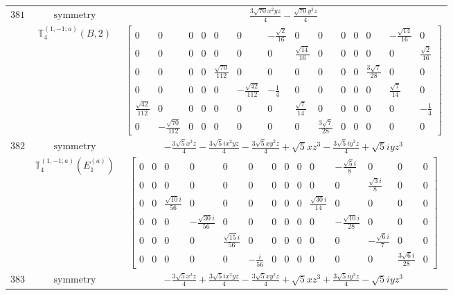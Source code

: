 \documentclass[fleqn,8pt,landscape]{jsarticle}
\begin{document}
\begin{longtable}{ccc}
$ 381 $ & $ \text{symmetry} $ & $ \frac{3 \sqrt{70} x^{2} y z}{4} - \frac{\sqrt{70} y^{3} z}{4} $ \\
$  $ & $ \mathbb{T}_{4}^{(1,-1;a)}(B,2) $ & $ \begin{bmatrix} 0 & 0 & 0 & 0 & 0 & 0 & - \frac{\sqrt{2}}{16} & 0 & 0 & 0 & 0 & 0 & - \frac{\sqrt{14}}{16} & 0 \\ 0 & 0 & 0 & 0 & 0 & 0 & 0 & \frac{\sqrt{14}}{16} & 0 & 0 & 0 & 0 & 0 & \frac{\sqrt{2}}{16} \\ 0 & 0 & 0 & 0 & \frac{\sqrt{70}}{112} & 0 & 0 & 0 & 0 & 0 & 0 & \frac{3 \sqrt{7}}{28} & 0 & 0 \\ 0 & 0 & 0 & 0 & 0 & - \frac{\sqrt{42}}{112} & - \frac{1}{4} & 0 & 0 & 0 & 0 & 0 & \frac{\sqrt{7}}{14} & 0 \\ \frac{\sqrt{42}}{112} & 0 & 0 & 0 & 0 & 0 & 0 & \frac{\sqrt{7}}{14} & 0 & 0 & 0 & 0 & 0 & - \frac{1}{4} \\ 0 & - \frac{\sqrt{70}}{112} & 0 & 0 & 0 & 0 & 0 & 0 & \frac{3 \sqrt{7}}{28} & 0 & 0 & 0 & 0 & 0 \end{bmatrix} $ \\ \hline
$ 382 $ & $ \text{symmetry} $ & $ - \frac{3 \sqrt{5} x^{3} z}{4} - \frac{3 \sqrt{5} i x^{2} y z}{4} - \frac{3 \sqrt{5} x y^{2} z}{4} + \sqrt{5} x z^{3} - \frac{3 \sqrt{5} i y^{3} z}{4} + \sqrt{5} i y z^{3} $ \\
$  $ & $ \mathbb{T}_{4}^{(1,-1;a)}(E_{1}^{(a)}) $ & $ \begin{bmatrix} 0 & 0 & 0 & 0 & 0 & 0 & 0 & 0 & 0 & 0 & - \frac{\sqrt{5} i}{8} & 0 & 0 & 0 \\ 0 & 0 & 0 & 0 & 0 & 0 & 0 & 0 & 0 & 0 & 0 & \frac{\sqrt{3} i}{8} & 0 & 0 \\ 0 & 0 & \frac{\sqrt{10} i}{56} & 0 & 0 & 0 & 0 & 0 & 0 & \frac{\sqrt{30} i}{14} & 0 & 0 & 0 & 0 \\ 0 & 0 & 0 & - \frac{\sqrt{30} i}{56} & 0 & 0 & 0 & 0 & 0 & 0 & - \frac{\sqrt{10} i}{28} & 0 & 0 & 0 \\ 0 & 0 & 0 & 0 & \frac{\sqrt{15} i}{56} & 0 & 0 & 0 & 0 & 0 & 0 & - \frac{\sqrt{6} i}{7} & 0 & 0 \\ 0 & 0 & 0 & 0 & 0 & - \frac{i}{56} & 0 & 0 & 0 & 0 & 0 & 0 & \frac{3 \sqrt{6} i}{28} & 0 \end{bmatrix} $ \\ \hline
$ 383 $ & $ \text{symmetry} $ & $ - \frac{3 \sqrt{5} x^{3} z}{4} + \frac{3 \sqrt{5} i x^{2} y z}{4} - \frac{3 \sqrt{5} x y^{2} z}{4} + \sqrt{5} x z^{3} + \frac{3 \sqrt{5} i y^{3} z}{4} - \sqrt{5} i y z^{3} $ \\

\end{longtable}
\end{document}
